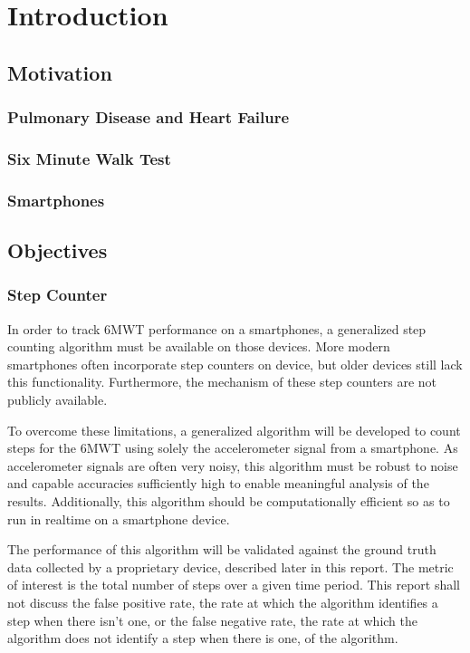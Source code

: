 \part{Introduction}

    \chapter{Motivation}

        \section{Pulmonary Disease and Heart Failure}

        \section{Six Minute Walk Test}

        \section{Smartphones}

    \chapter{Objectives}

        \section{Step Counter}

            In order to track 6MWT performance on a smartphones, a generalized step counting algorithm must be available on those devices. More modern smartphones often incorporate step counters on device, but older devices still lack this functionality. Furthermore, the mechanism of these step counters are not publicly available.

            To overcome these limitations, a generalized algorithm will be developed to count steps for the 6MWT using solely the accelerometer signal from a smartphone. As accelerometer signals are often very noisy, this algorithm must be robust to noise and capable accuracies sufficiently high to enable meaningful analysis of the results. Additionally, this algorithm should be computationally efficient so as to run in realtime on a smartphone device.

            The performance of this algorithm will be validated against the ground truth data collected by a proprietary device, described later in this report. The metric of interest is the total number of steps over a given time period. This report shall not discuss the false positive rate, the rate at which the algorithm identifies a step when there isn't one, or the false negative rate, the rate at which the algorithm does not identify a step when there is one, of the algorithm.

